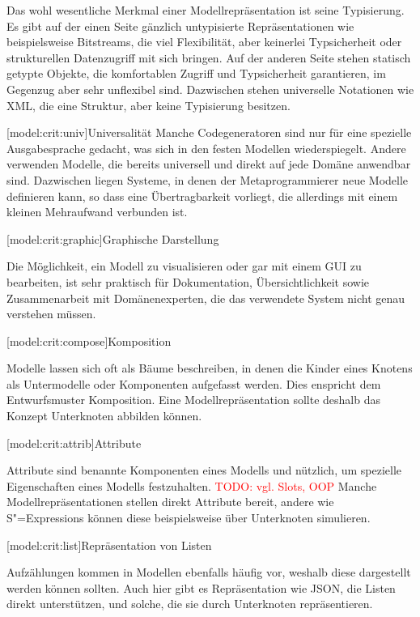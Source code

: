 \documentclass[11pt, a4paper, bibgerm]{scrbook}
\newcommand{\todo}[1]{
  \textcolor{red}{TODO: #1}
}
\newcommand\lsubsection{}
\newcommand{\sexps}{S"=Expressions}
\begin{document}
Das wohl wesentliche Merkmal einer Modellrepräsentation ist seine
Typisierung. Es gibt auf der einen Seite gänzlich untypisierte
Repräsentationen wie beispielsweise Bitstreams, die viel Flexibilität,
aber keinerlei Typsicherheit oder strukturellen Datenzugriff mit sich
bringen. Auf der anderen Seite stehen statisch getypte Objekte, die
komfortablen Zugriff und Typsicherheit garantieren, im Gegenzug aber
sehr unflexibel sind. Dazwischen stehen universelle Notationen wie XML,
die eine Struktur, aber keine Typisierung besitzen.

\lsubsection[model:crit:univ]{Universalität} Manche
Codegeneratoren sind nur für eine spezielle Ausgabesprache gedacht, was
sich in den festen Modellen wiederspiegelt. Andere verwenden Modelle,
die bereits universell und direkt auf jede Domäne anwendbar
sind. Dazwischen liegen Systeme, in denen der Metaprogrammierer neue
Modelle definieren kann, so dass eine Übertragbarkeit vorliegt, die
allerdings mit einem kleinen Mehraufwand verbunden ist.

\lsubsection[model:crit:graphic]{Graphische Darstellung}

Die Möglichkeit, ein Modell zu visualisieren oder gar mit einem GUI zu
bearbeiten, ist sehr praktisch für Dokumentation, Übersichtlichkeit
sowie Zusammenarbeit mit Domänenexperten, die das verwendete System
nicht genau verstehen müssen.

\lsubsection[model:crit:compose]{Komposition}

Modelle lassen sich oft als Bäume beschreiben, in denen die Kinder eines
Knotens als Untermodelle oder Komponenten aufgefasst werden. Dies
enspricht dem Entwurfsmuster Komposition\cite[S.182f]{CompositePattern}. Eine
Modellrepräsentation sollte deshalb das Konzept Unterknoten abbilden
können.

\lsubsection[model:crit:attrib]{Attribute}

Attribute sind benannte Komponenten eines Modells und nützlich, um
spezielle Eigenschaften eines Modells festzuhalten. \todo{vgl. Slots,
  OOP} Manche Modellrepräsentationen stellen direkt Attribute bereit,
andere wie \sexps{} können diese beispielsweise über Unterknoten
simulieren.

\lsubsection[model:crit:list]{Repräsentation von Listen}

Aufzählungen kommen in Modellen ebenfalls häufig vor, weshalb diese
dargestellt werden können sollten. Auch hier gibt es Repräsentation wie
JSON, die Listen direkt unterstützen, und solche, die sie durch
Unterknoten repräsentieren.
\end{document}
